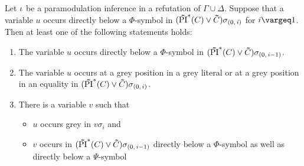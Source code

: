 \documentclass[%
	draft=false,%
	numbers=noendperiod,%
	11pt,%
	a4paper,%
	oneside,%
	openany,%
]{memoir}
\begin{document}
\begin{lemma}
	\label{lemma:var_below_phi_symbol_paramod}
	Let $\iota$ be a paramodulation inference in a refutation of $\Gamma\cup\Delta$.
	Suppose that a variable $u$ occurs directly below a $\Phi$-symbol in $(\bm\tilde{\operatorname{PI}}^{*}(C)\lor \bm\tilde{C})\sigma_{(0,\,i)}$ for $i\vargeq 1$.
	Then at least one of the following statements holds:
	\begin{enumerate}
		\item
			\label{15_1}
			The variable $u$ occurs directly below a $\Phi$-symbol in $(\bm\tilde{\operatorname{PI}}^{*}(C)\lor \bm\tilde{C})\sigma_{(0,\,i-1)}$.

		\item
			\label{15_5}
			The variable $u$ occurs at a grey position in a grey literal or at a grey position in an equality in $(\bm\tilde{\operatorname{PI}}^{*}(C)\lor \bm\tilde{C})\sigma_{(0,\,i)}$.

		\item 
			\label{15_2}
			There is a variable $v$ such that 
			{
				\renewcommand{\labelitemi}{\textendash}
				\begin{itemize}
					\item $u$ occurs grey in $v\sigma_i$ and
					\item $v$ occurs in $(\bm\tilde{\operatorname{PI}}^{*}(C)\lor \bm\tilde{C})\sigma_{(0,\,i-1)}$ directly below a $\Phi$-symbol as well as directly below a $\Psi$-symbol
				\end{itemize}
			}


	\end{enumerate}
\end{lemma}
\end{document}

